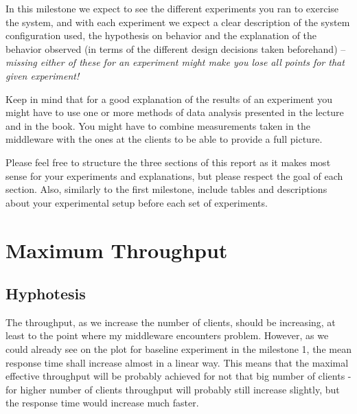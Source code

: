 \documentclass[11pt]{article}
\begin{document}
In this milestone we expect to see the different experiments you ran to exercise the system, and with each experiment we expect a clear description of the system configuration used, the hypothesis on behavior and the explanation of the behavior observed (in terms of the different design decisions taken beforehand) -- \emph{missing either of these for an experiment might make you lose all points for that given experiment!} 

Keep in mind that for a good explanation of the results of an experiment you might have to use one or more methods of data analysis presented in the lecture and in the book. You might have to combine measurements taken in the middleware with the ones at the clients to be able to provide a full picture.

Please feel free to structure the three sections of this report as it makes most sense for your experiments and explanations, but please respect the goal of each section. Also, similarly to the first milestone, include tables and descriptions about your experimental setup before each set of experiments.


\pagebreak

\section{Maximum Throughput}


\subsection{Hyphotesis}

The throughput, as we increase the number of clients, should be increasing, at least to the point where my middleware encounters problem. However, as we could already see on the plot for baseline experiment in the milestone 1, the mean response time shall increase almost in a linear way. This means that the maximal effective throughput will be probably achieved for not that big number of clients - for higher number of clients throughput will probably still increase slightly, but the response time would increase much faster.
\end{document}
